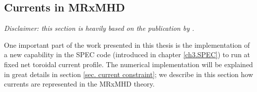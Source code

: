 \documentclass[my_thesis.tex]{subfiles}
\begin{document}


\subsection{Currents in MRxMHD}\label{ch2.mrxmhd_currents}


\textit{Disclaimer: this section is heavily based on the publication by \citet{Baillod2021}.}

One important part of the work presented in this thesis is the implementation of a new capability in the SPEC code (introduced in chapter \ref{ch3.SPEC}) to run at fixed net toroidal current profile. The numerical implementation will be explained in great details in section \ref{sec. current constraint}; we describe in this section how currents are represented in the MRxMHD theory.
\end{document}
